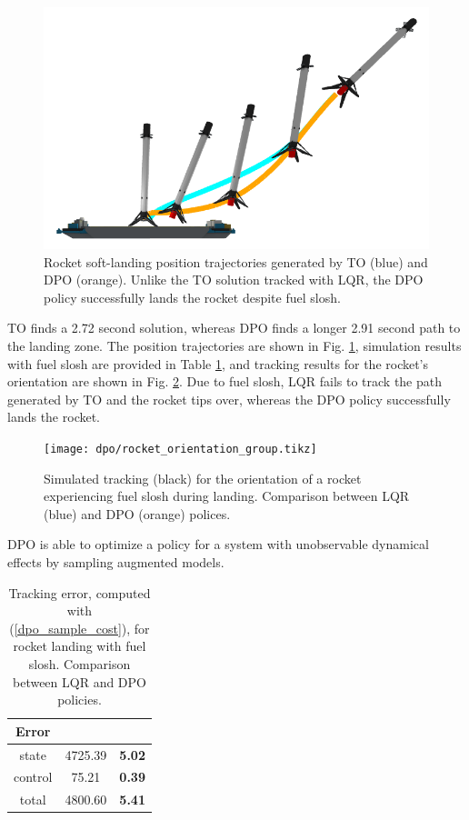 \begin{figure}[H]
	\centering
	\includegraphics[width=.5\textwidth]{dpo/rocket_landing_ghost.png}
	\caption[Comparison of LQR and Direct Policy Optimization for rocket soft-landing]{Rocket soft-landing position trajectories generated by TO (blue) and DPO (orange). Unlike the TO solution tracked with LQR, the DPO policy successfully lands the rocket despite fuel slosh.}
	\label{dpo_rocket_trajectory}
\end{figure}	

TO finds a 2.72 second solution, whereas DPO finds a longer 2.91 second path to the landing zone. The position trajectories are shown in Fig. \ref{dpo_rocket_trajectory}, simulation results with fuel slosh are provided in Table \ref{dpo_rocket_results}, and tracking results for the rocket's orientation are shown in Fig. \ref{dpo_rocket_tracking}. Due to fuel slosh, LQR fails to track the path generated by TO and the rocket tips over, whereas the DPO policy successfully lands the rocket. 

\begin{figure}[H]
 	\centering
 	\texttt{[image: dpo/rocket\_orientation\_group.tikz]}
 	\caption[Orientation tracking performance for rocket soft-landing]{Simulated tracking (black) for the orientation of a rocket experiencing fuel slosh during landing. Comparison between LQR (blue) and DPO (orange) polices.}
 	\label{dpo_rocket_tracking}
\end{figure}

DPO is able to optimize a policy for a system with unobservable dynamical effects by sampling augmented models.

\begin{table}[H]
	\centering
	\caption[Policy tracking error for rocket soft-landing]{Tracking error, computed with (\ref{dpo_sample_cost}), for rocket landing with fuel slosh. Comparison between LQR and DPO policies.}
	\begin{tabular}{c c c}
		\toprule
		\textbf{Error} &
		\specialcellbold{LQR} & 
		\specialcellbold{DPO} \\
		\toprule
		state & 4725.39 & \textbf{5.02}\\
		control & 75.21 & \textbf{0.39}\\
		total & 4800.60 & \textbf{5.41}\\
		\toprule
	\end{tabular}
	\label{dpo_rocket_results}
	\vspace{-0.5cm}
\end{table}

